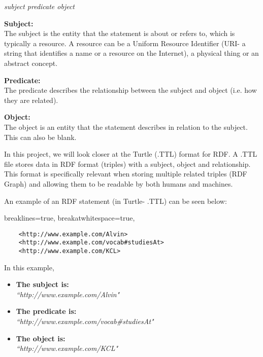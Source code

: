 \vspace{-0.1cm}
\begin{center}
\begin{beginquote}
   \textit{subject predicate object}
\end{beginquote} 
\end{center}
\vspace{-0.2cm}

\textbf{Subject:} \\
The subject is the entity that the statement is about or refers to, which is typically a resource. A resource can be a Uniform Resource Identifier (URI- a string that identifies a name or a resource on the Internet), a physical thing or an abstract concept. 

\textbf{Predicate:} \\
The predicate describes the relationship between the subject and object (i.e. how they are related). 

\textbf{Object:} \\
The object is an entity that the statement describes in relation to the subject. This can also be blank. 

In this project, we will look closer at the Turtle (.TTL) format for RDF. A .TTL file stores data in RDF format (triples) with a subject, object and relationship. This format is specifically relevant when storing multiple related triples (RDF Graph) and allowing them to be readable by both humans and machines. \cite{TTL}

An example of an RDF statement (in Turtle- .TTL) can be seen below:

\vspace{-0.4cm}
\lstset
{
    breaklines=true,
    breakatwhitespace=true,
}
\begin{center}
\begin{lstlisting}
    <http://www.example.com/Alvin> 
    <http://www.example.com/vocab#studiesAt> 
    <http://www.example.com/KCL>
\end{lstlisting}
\end{center} 
\vspace{-0.3cm}

\noindent In this example, 
\vspace{-0.15cm}
\begin{itemize}
    \itemsep0em 
\item \textbf{The subject is:} \\ \textit{``http://www.example.com/Alvin"}
\item \textbf{The predicate is:} \\ \textit{``http://www.example.com/vocab\#studiesAt"}
\item \textbf{The object is:} \\ \textit{``http://www.example.com/KCL"}
\end{itemize}
\vspace{-0.1cm}

